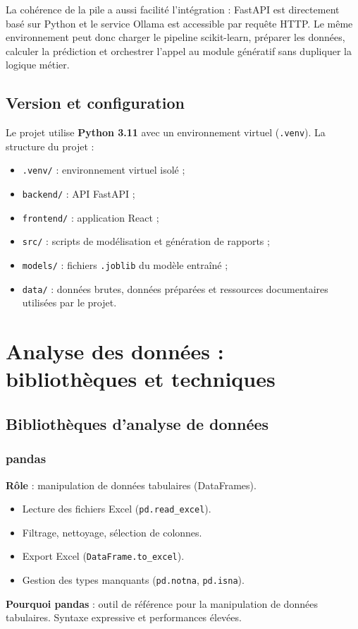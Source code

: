 \documentclass[12pt,a4paper]{report}
\begin{document}
La cohérence de la pile a aussi facilité l'intégration : FastAPI est directement basé sur
Python et le service Ollama est accessible par requête HTTP. Le même environnement peut
donc charger le pipeline scikit-learn, préparer les données, calculer la prédiction et
orchestrer l'appel au module génératif sans dupliquer la logique métier.

\subsection{Version et configuration}

Le projet utilise \textbf{Python 3.11} avec un environnement virtuel (\texttt{.venv}).
La structure du projet :

\begin{itemize}[leftmargin=1.5em]
 \item \texttt{.venv/} : environnement virtuel isolé ;
 \item \texttt{backend/} : API FastAPI ;
 \item \texttt{frontend/} : application React ;
 \item \texttt{src/} : scripts de modélisation et génération de rapports ;
 \item \texttt{models/} : fichiers \texttt{.joblib} du modèle entraîné ;
 \item \texttt{data/} : données brutes, données préparées et ressources documentaires utilisées par le projet.
\end{itemize}

\section{Analyse des données : bibliothèques et techniques}

\subsection{Bibliothèques d'analyse de données}

\subsubsection{pandas}

\textbf{Rôle} : manipulation de données tabulaires (DataFrames).
\begin{itemize}[leftmargin=1.5em]
 \item Lecture des fichiers Excel (\texttt{pd.read\_excel}).
 \item Filtrage, nettoyage, sélection de colonnes.
 \item Export Excel (\texttt{DataFrame.to\_excel}).
 \item Gestion des types manquants (\texttt{pd.notna}, \texttt{pd.isna}).
\end{itemize}
\textbf{Pourquoi pandas} : outil de référence pour la manipulation de données tabulaires.
Syntaxe expressive et performances élevées.
\end{document}
